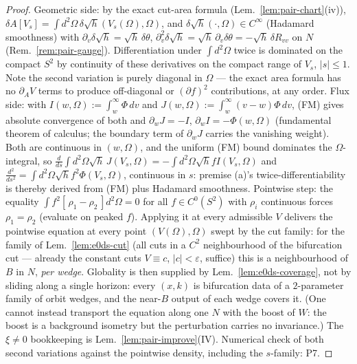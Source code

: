 \begin{proof}
Geometric side: by the exact cut-area formula
(Lem.~\ref{lem:pair-chart}(iv)),
$\delta A[V_{s}]=\int d^{2}\Omega\,\delta\sqrt h(V_{s}(\Omega),
\Omega)$, and $\delta\sqrt h(\cdot,\Omega)\in C^{\infty}$ (Hadamard
smoothness) with $\partial_{v}\delta\sqrt h=\sqrt h\,\delta\theta$,
$\partial_{v}^{2}\delta\sqrt h=\sqrt h\,\partial_{v}\delta\theta
=-\sqrt h\,\delta R_{vv}$ on $N$ (Rem.~\ref{rem:pair-gauge}).
Differentiation under $\int d^{2}\Omega$ twice is dominated on the
compact $S^{2}$ by continuity of these derivatives on the compact
range of $V_{s}$, $|s|\le1$. Note the second variation is purely
diagonal in $\Omega$ --- the exact area formula has no
$\partial_{A}V$ terms to produce off-diagonal or $(\partial f)^{2}$
contributions, at any order. Flux side: with
$I(w,\Omega):=\int_{w}^{\infty}\Phi\,dv$ and $J(w,\Omega):=\int_{w}
^{\infty}(v-w)\Phi\,dv$, (FM) gives absolute convergence of both and
$\partial_{w}J=-I$, $\partial_{w}I=-\Phi(w,\Omega)$ (fundamental
theorem of calculus; the boundary term of $\partial_{w}J$ carries the
vanishing weight). Both are continuous in $(w,\Omega)$, and the
uniform (FM) bound dominates the $\Omega$-integral, so
$\frac{d}{ds}\int d^{2}\Omega\sqrt h\,J(V_{s},\Omega)
=-\int d^{2}\Omega\sqrt h f I(V_{s},\Omega)$ and
$\frac{d^{2}}{ds^{2}}=\int d^{2}\Omega\sqrt h f^{2}\Phi(V_{s},
\Omega)$, continuous in $s$: premise (a)'s twice-differentiability is
thereby derived from (FM) plus Hadamard smoothness. Pointwise step:
the equality $\int f^{2}[\,\rho_{1}-\rho_{2}\,]d^{2}\Omega=0$ for all
$f\in C^{0}(S^{2})$ with $\rho_{i}$ continuous forces
$\rho_{1}=\rho_{2}$ (evaluate on peaked $f$). Applying it at every
admissible $V$ delivers the pointwise equation at every point
$(V(\Omega),\Omega)$ swept by the cut family: for the family of
Lem.~\ref{lem:e0ds-cut} (all cuts in a $C^{2}$ neighbourhood of the
bifurcation cut --- already the constant cuts $V\equiv c$,
$|c|<\varepsilon$, suffice) this is a neighbourhood of $B$ in $N$,
\emph{per wedge}. Globality is then supplied by
Lem.~\ref{lem:e0ds-coverage}, not by sliding along a single horizon:
every $(x,k)$ is bifurcation data of a $2$-parameter family of orbit
wedges, and the near-$B$ output of each wedge covers it. (One cannot
instead transport the equation along one $N$ with the boost of $W$:
the boost is a background isometry but the perturbation carries no
invariance.) The $\xi\neq0$ bookkeeping is
Lem.~\ref{lem:pair-improve}(IV).
Numerical check of both second variations against the pointwise
density, including the $s$-family: P7.
\end{proof}

